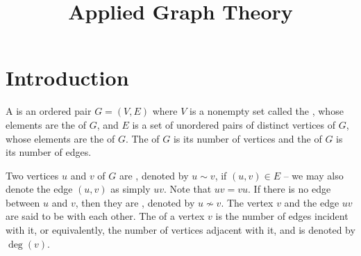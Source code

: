 
\title{\textbf{Applied Graph Theory}}

\date{}
\maketitle

\begingroup
\let\clearpage\relax
\tableofcontents
\endgroup

\clearpage

\renewcommand{\nomname}{List of Symbols}



\printnomenclature[10em]

\clearpage

\section{Introduction}\label{sec:Intro}
A  is an ordered pair $G = (V, E)$ where $V$ is a nonempty set called the , whose elements are the  of $G$, and $E$ is a set of unordered pairs of distinct vertices of $G$, whose elements are the  of $G$. The  of $G$ is its number of vertices and the  of $G$ is its number of edges.

Two vertices $u$ and $v$ of $G$ are , denoted by $u \sim v$, if $(u,v) \in E$ -- we may also denote the edge $(u,v)$ as simply $uv$. Note that $uv = vu$. If there is no edge between $u$ and $v$, then they are , denoted by $u \nsim v$. The vertex $v$ and the edge $uv$ are said to be  with each other. The  of a vertex $v$ is the number of edges incident with it, or equivalently, the number of vertices adjacent with it, and is denoted by $\deg(v)$.

